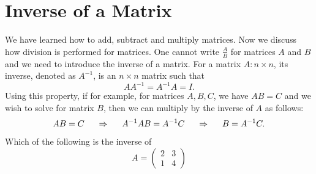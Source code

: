 \documentclass{ximera}
\begin{document}
\section*{Inverse of a Matrix}

We have learned how to add, subtract and multiply matrices. Now we discuss how division is performed for matrices. One cannot write $\frac{A}{B}$ for matrices $A$ and $B$ and we need to introduce the inverse of a matrix. For a matrix $A: n\times n$, its inverse, denoted as $A^{-1}$, is an $n\times n$ matrix such that
\begin{equation}\label{inverse}
AA^{-1}= A^{-1}A = I.
\end{equation}
Using this property, if for example, for matrices $A, B, C$, we have $AB = C$ and we wish to solve for matrix $B$, then we can multiply by the inverse of $A$ as follows:
\begin{equation*}
AB= C \hspace{.5cm} \Rightarrow \hspace{.5cm} A^{-1}AB= A^{-1}C \hspace{.5cm} \Rightarrow \hspace{.5cm} B = A^{-1}C.
\end{equation*}

\begin{question} Which of the following is the inverse of
\begin{equation*}
A= \left(\begin{array}{cc}
  2 & 3   \\
  1 &  4
\end{array}\right)
\end{equation*}
\begin{multipleChoice}


\choice{\[ \begin{pmatrix}
 -1\\ 2
\end{pmatrix}
\]}



\end{multipleChoice}
\end{question}
\end{document}
